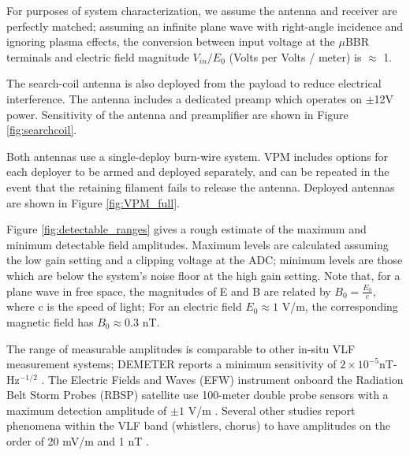 For purposes of system characterization, we assume the antenna and receiver are perfectly matched; assuming an infinite plane wave with right-angle incidence and ignoring plasma effects, the conversion between input voltage at the $\mu$BBR terminals and electric field magnitude $V_{in}/E_0$ (Volts per Volts / meter) is $\approx$ 1.

The search-coil antenna is also deployed from the payload to reduce electrical interference. The antenna includes a dedicated preamp which operates on $\pm$12V power. Sensitivity of the antenna and preamplifier are shown in Figure \ref{fig:searchcoil}.

Both antennas use a single-deploy burn-wire system. VPM includes options for each deployer to be armed and deployed separately, and can be repeated in the event that the retaining filament fails to release the antenna. Deployed antennas are shown in Figure \ref{fig:VPM_full}.

Figure \ref{fig:detectable_ranges} gives a rough estimate of the maximum and minimum detectable field amplitudes. Maximum levels are calculated assuming the low gain setting and a clipping voltage at the ADC; minimum levels are those which are below the system's noise floor at the high gain setting. Note that, for a plane wave in free space, the magnitudes of E and B are related by $B_0 = \frac{E_0}{c}$, where c is the speed of light; For an electric field $E_0 \approx 1$ V/m, the corresponding magnetic field has $B_0 \approx 0.3$ nT.

The range of measurable amplitudes is comparable to other in-situ VLF measurement systems; DEMETER reports a minimum sensitivity of $2\times10^{-5}$nT-Hz$^{-1/2}$ \citep{Cussac2006}. The Electric Fields and Waves (EFW) instrument onboard the Radiation Belt Storm Probes (RBSP) satellite use 100-meter double probe sensors with a maximum detection amplitude of $\pm 1$ V/m \citep{Wygant2014}. Several other studies report phenomena within the VLF band (whistlers, chorus) to have amplitudes on the order of 20 mV/m and 1 nT \citep{Wygant2014, Cattell2015, Bhattacharya2009}.



